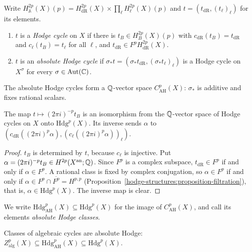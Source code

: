 \begin{definition}[Deligne]\label{absolute-hodge:definition-hodge-cycle}
Write $H^{2p}_{\mathbb{A}}(X)(p) = H^{2p}_{\mathrm{dR}}(X) \times \prod_\ell H^{2p}_\ell(X)(p)$ and $t = (t_{\mathrm{dR}}, (t_\ell)_\ell)$ for its elements.
\begin{enumerate}
\item $t$ is a \emph{Hodge cycle} on $X$ if there is $t_B \in H^{2p}_B(X)(p)$ with $c_{\mathrm{dR}}(t_B) = t_{\mathrm{dR}}$ and $c_\ell(t_B) = t_\ell$ for all $\ell$, and $t_{\mathrm{dR}} \in F^pH^{2p}_{\mathrm{dR}}(X)$.
\item $t$ is an \emph{absolute Hodge cycle} if $\sigma_*t = (\sigma_*t_{\mathrm{dR}}, (\sigma_*t_\ell)_\ell)$ is a Hodge cycle on $X^\sigma$ for every $\sigma \in \mathrm{Aut}(\mathbb{C})$.
\end{enumerate}
The absolute Hodge cycles form a $\mathbb{Q}$-vector space $C^p_{\mathrm{AH}}(X)$: $\sigma_*$ is additive and fixes rational scalars.
\end{definition}

\begin{lemma}\label{absolute-hodge:lemma-hodge-cycles}
The map $t \mapsto (2\pi i)^{-p}t_B$ is an isomorphism from the $\mathbb{Q}$-vector space of Hodge cycles on $X$ onto $\mathrm{Hdg}^p(X)$. Its inverse sends $\alpha$ to
$(c_{\mathrm{dR}}((2\pi i)^p\alpha), (c_\ell((2\pi i)^p\alpha))_\ell)$.
\end{lemma}

\begin{proof}
$t_B$ is determined by $t$, because $c_\ell$ is injective. Put $\alpha = (2\pi i)^{-p}t_B \in H^{2p}(X^{\mathrm{an}}; \mathbb{Q})$. Since $F^p$ is a complex subspace, $t_{\mathrm{dR}} \in F^p$ if and only if $\alpha \in F^p$.
A rational class is fixed by complex conjugation, so $\alpha \in F^p$ if and only if $\alpha \in F^p \cap \overline{F^p} = H^{p,p}$ (Proposition~\ref{hodge-structures:proposition-filtration}), that is,
$\alpha \in \mathrm{Hdg}^p(X)$. The inverse map is clear.
\end{proof}

We write $\mathrm{Hdg}^p_{\mathrm{AH}}(X) \subseteq \mathrm{Hdg}^p(X)$ for the image of $C^p_{\mathrm{AH}}(X)$, and call its elements \emph{absolute Hodge classes}.

\begin{proposition}\label{absolute-hodge:proposition-algebraic}
Classes of algebraic cycles are absolute Hodge: $Z^p_{\mathrm{alg}}(X) \subseteq \mathrm{Hdg}^p_{\mathrm{AH}}(X) \subseteq \mathrm{Hdg}^p(X)$.
\end{proposition}

